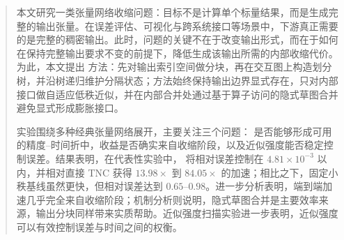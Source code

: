\begin{abstract}
本文研究一类张量网络收缩问题：目标不是计算单个标量结果，而是生成完整的输出张量。在误差评估、可视化与跨系统接口等场景中，下游真正需要的是完整的稠密输出。此时，问题的关键不在于改变输出形式，而在于如何在保持完整输出要求不变的前提下，降低生成该输出所需的内部收缩代价。为此，本文提出 \ours{} 方法：先对输出索引空间做分块，再在交互图上构造划分树，并沿树递归维护分隔状态；方法始终保持输出边界显式存在，只对内部接口做自适应低秩近似，并在内部合并处通过基于算子访问的隐式草图合并避免显式形成膨胀接口。

实验围绕多种经典张量网络展开，主要关注三个问题：\ours{} 是否能够形成可用的精度--时间折中，收益是否确实来自收缩阶段，以及近似强度能否稳定控制误差。结果表明，在代表性实验中，\ours{} 将相对误差控制在 $4.81\times 10^{-3}$ 以内，并相对直接 TNC 获得 $13.98\times$ 到 $84.05\times$ 的加速；相比之下，固定小秩基线虽然更快，但相对误差达到 $0.65$--$0.98$。进一步分析表明，端到端加速几乎完全来自收缩阶段；机制分析则说明，隐式草图合并是主要效率来源，输出分块同样带来实质帮助。近似强度扫描实验进一步表明，近似强度可以有效控制误差与时间之间的权衡。
\end{abstract}